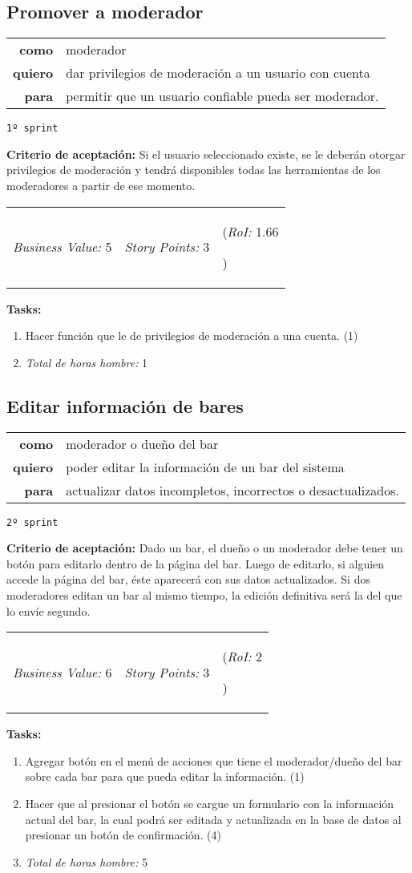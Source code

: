 \documentclass[hidelinks,a4paper,11pt, nofootinbib]{article}
\newcommand{\userstory}[3]{
\begin{tabular}{|r p{10cm}|}
  \hline
  \textbf{como} & #1 \\
  \textbf{quiero} & #2 \\
  \textbf{para} & #3 \\
  \hline
\end{tabular}

}
\newcommand{\critdeacep}[1]{\textbf{Criterio de aceptación:} #1

}
\newcommand{\busvalue}[1]{\textit{Business Value:} #1

}
\newcommand{\storypoints}[1]{\textit{Story Points:} #1

}
\newcommand{\roi}[1]{\textit{RoI:} #1

}
\newcommand{\valores}[3]{
\begin{tabular}{l l l}
  \busvalue{#1} & \storypoints{#2} & (\roi{#3}) \\ 
\end{tabular}

}
\newcommand{\primersprint}{\texttt{1º sprint}

}
\newcommand{\segundosprint}{\texttt{2º sprint}

}
\newcommand{\tasks}[1]{\textbf{Tasks:} 

#1}
\begin{document}
\subsection*{Promover a moderador}
\userstory{moderador}{dar privilegios de moderación a un usuario con cuenta}{permitir que un usuario confiable pueda ser moderador.}
\primersprint
\critdeacep{Si el usuario seleccionado existe, se le deberán otorgar privilegios de moderación y tendrá disponibles todas las herramientas de los moderadores a partir de ese momento.}
\valores{5}{3}{1.66}
\tasks{
  \begin{enumerate}
    \item Hacer función que le de privilegios de moderación a una cuenta. (1)
    \item[] \textit{Total de horas hombre:} 1
  \end{enumerate}
}





\subsection*{Editar información de bares}
\userstory{moderador o dueño del bar}{poder editar la información de un bar del sistema}{actualizar datos incompletos, incorrectos o desactualizados.
}
\segundosprint
\critdeacep{Dado un bar, el dueño o un moderador debe tener un botón para editarlo dentro de la página del bar. Luego de editarlo, si alguien accede la página del bar, éste aparecerá con sus datos actualizados. Si dos moderadores editan un bar al mismo tiempo, la edición definitiva será la del que lo envíe segundo.}
\valores{6}{3}{2}
\tasks{
  \begin{enumerate}
    \item Agregar botón en el menú de acciones que tiene el moderador/dueño del bar sobre cada bar para que pueda editar la información. (1)
    \item Hacer que al presionar el botón se cargue un formulario con la información actual del bar, la cual podrá ser editada y actualizada en la base de datos al presionar un botón de confirmación. (4)
    \item[] \textit{Total de horas hombre:} 5
  \end{enumerate}
}
    
\end{document}
